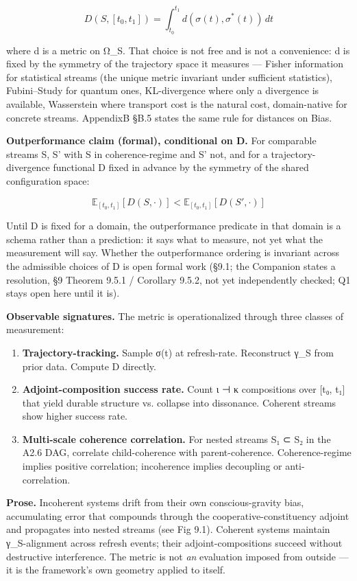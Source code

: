\documentclass[11pt, openany]{book}
\begin{document}
$$D(S, [t_0, t_1]) = \int_{t_0}^{t_1} d(\sigma(t), \sigma^*(t)) \, dt$$

where d is a metric on Ω\_\allowbreak{}S. That choice is not free and is not a convenience: d is fixed by the symmetry of the trajectory space it measures --- Fisher information for statistical streams (the unique metric invariant under sufficient statistics), Fubini–Study for quantum ones, KL-divergence where only a divergence is available, Wasserstein where transport cost is the natural cost, domain-native for concrete streams. AppendixB §B.5 states the same rule for distances on Bias.

\textbf{Outperformance claim (formal), conditional on D.} For comparable streams S, S' with S in coherence-regime and S' not, and for a trajectory-divergence functional D fixed in advance by the symmetry of the shared configuration space:

$$\mathbb{E}_{[t_0, t_1]}[D(S, \cdot)] < \mathbb{E}_{[t_0, t_1]}[D(S', \cdot)]$$

Until D is fixed for a domain, the outperformance predicate in that domain is a schema rather than a prediction: it says what to measure, not yet what the measurement will say. Whether the outperformance ordering is invariant across the admissible choices of D is open formal work (§9.1; the Companion states a resolution, §9 Theorem 9.5.1 / Corollary 9.5.2, not yet independently checked; Q1 stays open here until it is).

\textbf{Observable signatures.} The metric is operationalized through three classes of measurement:

\begin{enumerate}
\item \textbf{Trajectory-tracking.} Sample σ(t) at refresh-rate. Reconstruct γ\_\allowbreak{}S from prior data. Compute D directly.
\item \textbf{Adjoint-composition success rate.} Count ι ⊣ κ compositions over [t₀, t₁] that yield durable structure vs. collapse into dissonance. Coherent streams show higher success rate.
\item \textbf{Multi-scale coherence correlation.} For nested streams S₁ ⊂ S₂ in the A2.6 DAG, correlate child-coherence with parent-coherence. Coherence-regime implies positive correlation; incoherence implies decoupling or anti-correlation.
\end{enumerate}

\textbf{Prose.} Incoherent systems drift from their own conscious-gravity bias, accumulating error that compounds through the cooperative-constituency adjoint and propagates into nested streams (see Fig 9.1). Coherent systems maintain γ\_\allowbreak{}S-alignment across refresh events; their adjoint-compositions succeed without destructive interference. The metric is not \textit{an} evaluation imposed from outside --- it is the framework's own geometry applied to itself.
\end{document}
